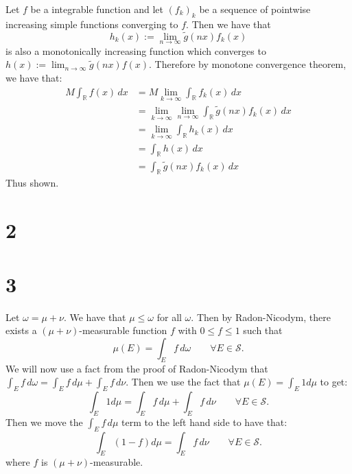 \documentclass{article}
\theoremstyle{definition}
\numberwithin{theorem}{section}
\numberwithin{equation}{section}
\begin{document}
Let $f$ be a integrable function and let $\left(  f_k \right)_k$ be a sequence of pointwise increasing simple functions converging to $f$. Then we have that
\begin{equation}
	h_k(x) := \lim_{n \rightarrow \infty} \tilde{g}(nx)f_k(x)
\end{equation}
is also a monotonically increasing function which converges to $h(x) := \lim_{n \rightarrow \infty} \tilde{g}(nx) f(x)$. Therefore by monotone convergence theorem, we have that:
\begin{align*}
	M \int_{\mathbb{R}} f(x) \, dx
	&= M \lim_{k \rightarrow \infty} \int_{\mathbb{R}} f_k(x) \, dx\\
	&= \lim_{k \rightarrow \infty} \lim_{n \rightarrow \infty} \int_{\mathbb{R}}  \tilde{g}(nx)f_k(x)\, dx\\
	&= \lim_{k \rightarrow \infty} \int_{\mathbb{R}}  h_k(x) \, dx\\
	&= \int_{\mathbb{R}} h(x) \, dx\\
	&= \int_{\mathbb{R}} \tilde{g}(nx)f_k(x) \, dx
\end{align*}
Thus shown.

\section{2}

\section{3}
Let $\omega = \mu + \nu$. We have that $\mu \leq \omega$ for all $\omega$. Then by Radon-Nicodym, there exists a $(\mu + \nu)$-measurable function $f$ with $0 \leq f \leq 1$ such that
\begin{equation}
	\mu(E) = \int_E f \, d\omega \qquad \forall E \in \mathcal{S}.
\end{equation} 
We will now use a fact from the proof of Radon-Nicodym that $\int_E f \, d\omega = \int_E f \, d\mu +  \int_E f \, d\nu$. Then we use the fact that $\mu(E) = \int_E 1 d\mu$ to get:
\begin{equation}
	\int_E 1 d\mu = \int_E f \, d\mu +  \int_E f \, d\nu \qquad \forall E \in \mathcal{S}.
\end{equation}
Then we move the $\int_E f \, d\mu$ term to the left hand side to have that:
\begin{equation}
	\int_E \left(1 - f\right) d\mu = \int_E f \, d\nu \qquad \forall E \in \mathcal{S}.
\end{equation}
where $f$ is $(\mu + \nu)$-measurable. 
\end{document}
